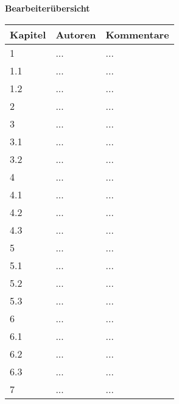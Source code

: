 {\textbf{Bearbeiterübersicht}}\\[2ex]
\begin{longtable}{|m{3.38cm}|m{4.0cm}|m{6.0cm}|}
  \hline                                              %
  \textbf{Kapitel}  &    \textbf{Autoren}  &    \textbf{Kommentare} \\ 
  \hline \hline                                       %
  
  1   &    ...    &    ...  \\ \hline
  1.1 &    ...    &    ...  \\ \hline
  1.2 &    ...    &    ...  \\ \hline
  2   &    ...    &    ...  \\ \hline
  3   &    ...    &    ...  \\ \hline
  3.1 &    ...    &    ...  \\ \hline
  3.2 &    ...    &    ...  \\ \hline
  4   &    ...    &    ...  \\ \hline
  4.1 &    ...    &    ...  \\ \hline
  4.2 &    ...    &    ...  \\ \hline
  4.3 &    ...    &    ...  \\ \hline
  5   &    ...    &    ...  \\ \hline
  5.1 &    ...    &    ...  \\ \hline
  5.2 &    ...    &    ...  \\ \hline
  5.3 &    ...    &    ...  \\ \hline
  6   &    ...    &    ...  \\ \hline
  6.1 &    ...    &    ...  \\ \hline
  6.2 &    ...    &    ...  \\ \hline
  6.3 &    ...    &    ...  \\ \hline
  7   &    ...    &    ...  \\ \hline
\end{longtable}

\tableofcontents                           %
\listoffigures              
\newpage
\listoftodos[Notes]









\printglossaries


